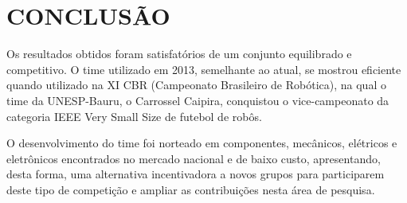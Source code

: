 \section*{CONCLUSÃO} 
Os resultados obtidos foram satisfatórios de um conjunto
equilibrado e competitivo. O time utilizado em 2013,
semelhante ao atual, se mostrou eficiente quando utilizado na
XI CBR (Campeonato Brasileiro de Robótica), na qual o time
da UNESP-Bauru, o Carrossel Caipira, conquistou o
vice-campeonato da categoria IEEE Very Small Size de
futebol de robôs.

O desenvolvimento do time foi norteado em componentes,
mecânicos, elétricos e eletrônicos encontrados no mercado
nacional e de baixo custo, apresentando, desta forma, uma
alternativa incentivadora a novos grupos para participarem
deste tipo de competição e ampliar as contribuições nesta área
de pesquisa. 
